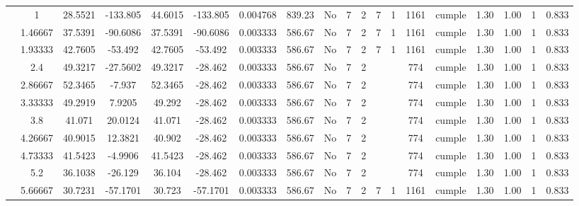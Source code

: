 \begin{table}[H]
{\begin{tabular}{|c|c|c|c|c|c|r|c|c|c|c|c|c|c|c|c|c|c|c|}
\cline{2-19}    & \cellcolor[rgb]{ .851,  .882,  .949}1 & 28.5521 & -133.805 & 44.6015 & -133.805 & 0.004768 & 839.23 & No  & 7   & 2   & 7   & 1   & 1161 & \cellcolor[rgb]{ .776,  .937,  .808}cumple & 1.30 & 1.00 & 1   & 0.833 \bigstrut\\
\cline{2-19}    & 1.46667 & 37.5391 & -90.6086 & 37.5391 & -90.6086 & 0.003333 & 586.67 & No  & 7   & 2   & 7   & 1   & 1161 & \cellcolor[rgb]{ .776,  .937,  .808}cumple & 1.30 & 1.00 & 1   & 0.833 \bigstrut\\
\cline{2-19}    & 1.93333 & 42.7605 & -53.492 & 42.7605 & -53.492 & 0.003333 & 586.67 & No  & 7   & 2   & 7   & 1   & 1161 & \cellcolor[rgb]{ .776,  .937,  .808}cumple & 1.30 & 1.00 & 1   & 0.833 \bigstrut\\
\cline{2-19}    & 2.4 & 49.3217 & -27.5602 & 49.3217 & -28.462 & 0.003333 & 586.67 & No  & 7   & 2   &     &     & 774 & \cellcolor[rgb]{ .776,  .937,  .808}cumple & 1.30 & 1.00 & 1   & 0.833 \bigstrut\\
\cline{2-19}    & 2.86667 & 52.3465 & -7.937 & 52.3465 & -28.462 & 0.003333 & 586.67 & No  & 7   & 2   &     &     & 774 & \cellcolor[rgb]{ .776,  .937,  .808}cumple & 1.30 & 1.00 & 1   & 0.833 \bigstrut\\
\cline{2-19}    & 3.33333 & 49.2919 & 7.9205 & 49.292 & -28.462 & 0.003333 & 586.67 & No  & 7   & 2   &     &     & 774 & \cellcolor[rgb]{ .776,  .937,  .808}cumple & 1.30 & 1.00 & 1   & 0.833 \bigstrut\\
\cline{2-19}    & 3.8 & 41.071 & 20.0124 & 41.071 & -28.462 & 0.003333 & 586.67 & No  & 7   & 2   &     &     & 774 & \cellcolor[rgb]{ .776,  .937,  .808}cumple & 1.30 & 1.00 & 1   & 0.833 \bigstrut\\
\cline{2-19}    & 4.26667 & 40.9015 & 12.3821 & 40.902 & -28.462 & 0.003333 & 586.67 & No  & 7   & 2   &     &     & 774 & \cellcolor[rgb]{ .776,  .937,  .808}cumple & 1.30 & 1.00 & 1   & 0.833 \bigstrut\\
\cline{2-19}    & 4.73333 & 41.5423 & -4.9906 & 41.5423 & -28.462 & 0.003333 & 586.67 & No  & 7   & 2   &     &     & 774 & \cellcolor[rgb]{ .776,  .937,  .808}cumple & 1.30 & 1.00 & 1   & 0.833 \bigstrut\\
\cline{2-19}    & 5.2 & 36.1038 & -26.129 & 36.104 & -28.462 & 0.003333 & 586.67 & No  & 7   & 2   &     &     & 774 & \cellcolor[rgb]{ .776,  .937,  .808}cumple & 1.30 & 1.00 & 1   & 0.833 \bigstrut\\
\cline{2-19}    & 5.66667 & 30.7231 & -57.1701 & 30.723 & -57.1701 & 0.003333 & 586.67 & No  & 7   & 2   & 7   & 1   & 1161 & \cellcolor[rgb]{ .776,  .937,  .808}cumple & 1.30 & 1.00 & 1   & 0.833 \bigstrut\\

\end{tabular}}
\end{table}
